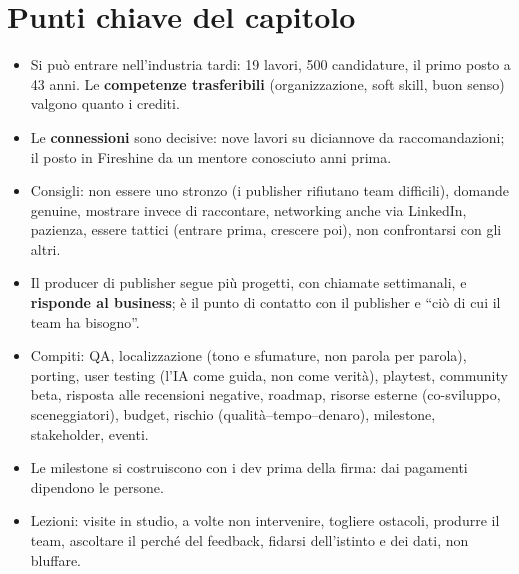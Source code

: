 \section*{Punti chiave del capitolo}

\begin{itemize}
  \item Si può entrare nell'industria tardi: 19 lavori, 500 candidature, il primo
        posto a 43 anni. Le \textbf{competenze trasferibili} (organizzazione,
        soft skill, buon senso) valgono quanto i crediti.
  \item Le \textbf{connessioni} sono decisive: nove lavori su diciannove da
        raccomandazioni; il posto in Fireshine da un mentore conosciuto anni prima.
  \item Consigli: non essere uno stronzo (i publisher rifiutano team difficili),
        domande genuine, mostrare invece di raccontare, networking anche via
        LinkedIn, pazienza, essere tattici (entrare prima, crescere poi), non
        confrontarsi con gli altri.
  \item Il producer di publisher segue più progetti, con chiamate settimanali, e
        \textbf{risponde al business}; è il punto di contatto con il publisher e
        ``ciò di cui il team ha bisogno''.
  \item Compiti: QA, localizzazione (tono e sfumature, non parola per parola),
        porting, user testing (l'IA come guida, non come verità), playtest,
        community beta, risposta alle recensioni negative, roadmap, risorse
        esterne (co-sviluppo, sceneggiatori), budget, rischio
        (qualità--tempo--denaro), milestone, stakeholder, eventi.
  \item Le milestone si costruiscono con i dev prima della firma: dai pagamenti
        dipendono le persone.
  \item Lezioni: visite in studio, a volte non intervenire, togliere ostacoli,
        produrre il team, ascoltare il perché del feedback, fidarsi dell'istinto e
        dei dati, non bluffare.
\end{itemize}

